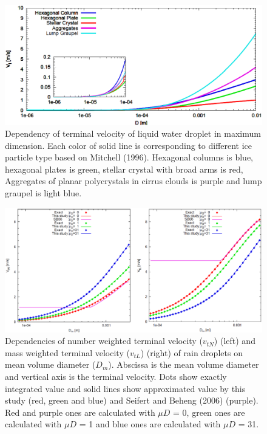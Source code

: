 \begin{figure}[htbp]
\begin{center}
\includegraphics[scale=0.3]{./figure/D_vt_sn14-ice.eps}
\end{center}
\caption{Dependency of terminal velocity of liquid water droplet in maximum dimension. Each color of solid line is corresponding to different ice particle type based on Mitchell (1996). Hexagonal columns is blue, hexagonal plates is green, stellar crystal with broad arms is red, Aggregates of planar polycrystals in cirrus clouds is purple and lump graupel is light blue.}
\label{figsn2-12}
\end{figure}

\begin{figure}[htbp]
\begin{center}
\includegraphics[scale=0.4]{./figure/D_vt_sn14-1.eps}
\end{center}
\caption{Dependencies of number weighted terminal velocity ($v_{tN}$) (left) and mass weighted terminal velocity ($v_{tL}$) (right) of rain droplets on mean volume diameter ($D_{m}$). Abscissa is the mean volume diameter and vertical axis is the terminal velocity. Dots show exactly integrated value and solid lines show approximated value by this study (red, green and blue) and Seifert and Beheng (2006) (purple). Red and purple ones are calculated with $\mu D$ = 0, green ones are calculated with $\mu D$ = 1 and blue ones are calculated with $\mu D$ = 31.}
\label{figsn2-13}
\end{figure}

